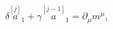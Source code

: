 \begin{equation}
\delta \stackrel{[j]}{a}_{1}+\gamma \stackrel{[j-1]}{a}_{1}=\partial _{\mu
}m^{\mu },  \label{bf60}
\end{equation}

